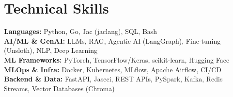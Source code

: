 \section{\Large Technical Skills}
\resumeSubHeadingListStart
  \small{\item{
    \textbf{Languages:} Python, Go, Jac (jaclang), SQL, Bash \\[2pt]
    \textbf{AI/ML \& GenAI:} LLMs, RAG, Agentic AI (LangGraph), Fine-tuning (Unsloth), NLP, Deep Learning \\[2pt]
    \textbf{ML Frameworks:} PyTorch, TensorFlow/Keras, scikit-learn, Hugging Face \\[2pt]
    \textbf{MLOps \& Infra:} Docker, Kubernetes, MLflow, Apache Airflow, CI/CD \\[2pt]
    \textbf{Backend \& Data:} FastAPI, Jaseci, REST APIs, PySpark, Kafka, Redis Streams, Vector Databases (Chroma)
  }}
\resumeSubHeadingListEnd
